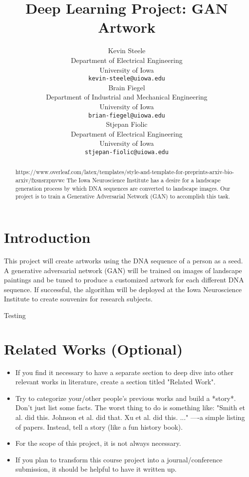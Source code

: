 \documentclass{article}
\title{Deep Learning Project: GAN Artwork}
\author{
	Kevin Steele \\
	Department of Electrical Engineering \\
	University of Iowa\\
	\texttt{kevin-steele@uiowa.edu} \\
	\And
	Brain Fiegel \\
	Department of Industrial and Mechanical Engineering \\
	University of Iowa\\
	\texttt{brian-fiegel@uiowa.edu} \\
	\And
	Stjepan Fiolic \\
	Department of Electrical Engineering \\
	University of Iowa\\
	\texttt{stjepan-fiolic@uiowa.edu} \\
}
\begin{document}
	\maketitle
	
	\begin{abstract}
		https://www.overleaf.com/latex/templates/style-and-template-for-preprints-arxiv-bio-arxiv/fxsnsrzpnvwc
		The Iowa Neuroscience Institute has a desire for a landscape generation process by which DNA sequences are converted to landscape images. Our project is to train a Generative Adversarial Network (GAN) to accomplish this task.
	\end{abstract}
	
	
	
	
	\section{Introduction}

	
	This project will create artworks using the DNA sequence of a person as a seed. A generative adversarial network (GAN) will be trained on images of landscape paintings and be tuned to produce a customized artwork for each different DNA sequence. If successful, the algorithm will be deployed at the Iowa Neuroscience Institute to create souvenirs for research subjects.
	
	Testing
	
	\section{Related Works (Optional)}
	\label{sec:headings}
	
	\begin{itemize}
		\item If you find it necessary to have a separate section to deep dive into other relevant works in literature, create a section titled "Related Work".
		\item Try to categorize your/other people's previous works and build a *story*. Don't just list some facts. The worst thing to do is something like: "Smith et al. did this. Johnson et al. did that. Xu et al. did this. ..." ----a simple listing of papers. Instead, tell a story (like a fun history book).
		\item For the scope of this project, it is not always necessary.
		\item If you plan to transform this course project into a journal/conference submission, it should be helpful to have it written up.
	\end{itemize}
	
\end{document}
